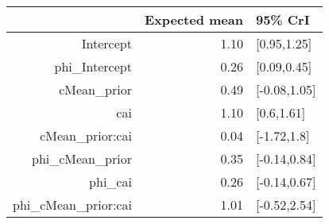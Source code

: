 \begin{tabular}{rrl}
  \hline
 & Expected mean & 95\% CrI \\ 
  \hline
Intercept & 1.10 & [0.95,1.25] \\ 
  phi\_Intercept & 0.26 & [0.09,0.45] \\ 
  cMean\_prior & 0.49 & [-0.08,1.05] \\ 
  cai & 1.10 & [0.6,1.61] \\ 
  cMean\_prior:cai & 0.04 & [-1.72,1.8] \\ 
  phi\_cMean\_prior & 0.35 & [-0.14,0.84] \\ 
  phi\_cai & 0.26 & [-0.14,0.67] \\ 
  phi\_cMean\_prior:cai & 1.01 & [-0.52,2.54] \\ 
   \hline
\end{tabular}

